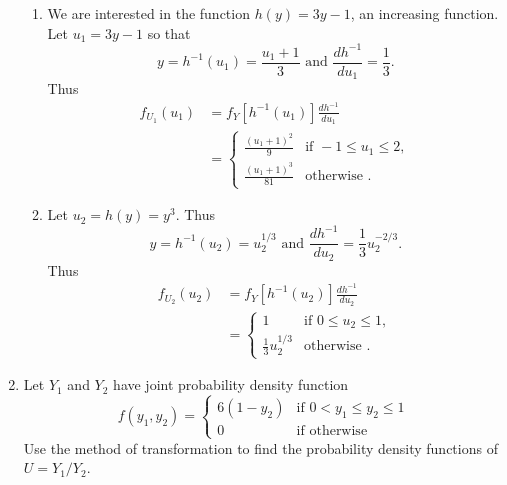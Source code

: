 \documentclass[9pt]{article}
\newcommand{\D}{\displaystyle}
\begin{document}
\begin{enumerate}
      \begin{enumerate}
         \item We are interested in the function $h(y) = 3y - 1$, an increasing
               function. Let $u_1 = 3y - 1$ so that
               $$y = h^{-1}(u_1) = \frac{u_1+1}{3} \text{ and }
                 \frac{dh^{-1}}{du_1} = \frac{1}{3}.$$
               Thus
               \begin{align*}
                  f_{U_1}(u_1) &= f_Y[h^{-1}(u_1)]\frac{dh^{-1}}{du_1} \\
                     &= \begin{cases}
                     \D\frac{(u_1+1)^2}{9} & \text{if } -1 \le u_1 \le 2, \\
                     \D\frac{(u_1+1)^3}{81} & \text{otherwise }.                  
                  \end{cases}
               \end{align*}
         \item Let $u_2 = h(y) = y^3$. Thus
               $$y = h^{-1}(u_2) = u_2^{1/3} \text{ and }
                 \frac{dh^{-1}}{du_2} = \frac{1}{3}u_2^{-2/3}.$$
               Thus
               \begin{align*}
                  f_{U_2}(u_2) &= f_Y[h^{-1}(u_2)]\frac{dh^{-1}}{du_2} \\
                     &= \begin{cases}
                     1 & \text{if } 0 \le u_2 \le 1, \\
                     \D\frac{1}{3}u_2^{1/3} & \text{otherwise }.                  
                  \end{cases}
               \end{align*}
      \end{enumerate}
   \item Let $Y_1$ and $Y_2$ have joint probability density function         
         \begin{equation*}
            f(y_1, y_2) = \begin{cases}
               6(1 - y_2)   & \text{if } 0 < y_1 \le y_2 \le 1 \\
               0 & \text{if } \text{otherwise}
            \end{cases}
         \end{equation*}
         Use the method of transformation to find the probability density
         functions of $U = Y_1 / Y_2$.


\end{enumerate}
\end{document}
